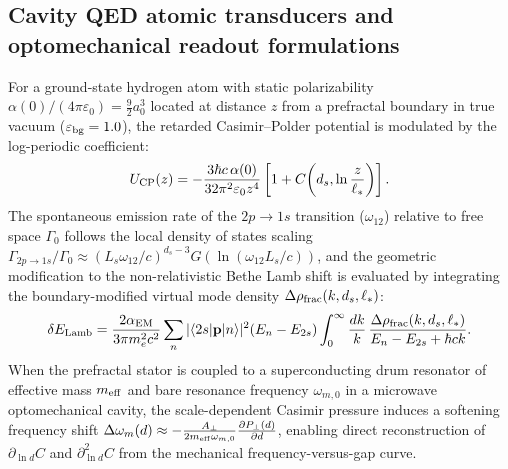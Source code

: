 \documentclass[11pt,letterpaper]{article}
\begin{document}
\subsection*{Cavity QED atomic transducers and optomechanical readout formulations}
For a ground-state hydrogen atom with static polarizability $\alpha(0)/(4\pi\varepsilon_0) = \frac{9}{2}a_0^3$ located at distance $z$ from a prefractal boundary in true vacuum ($\varepsilon_{\rm bg}=1.0$), the retarded Casimir--Polder potential is modulated by the log-periodic coefficient:
\begin{equation}
U_{\rm CP}(z) = -\frac{3\hbar c \, \alpha(0)}{32\pi^2 \varepsilon_0 z^4} \left[ 1 + C\!\left(d_s, \ln\frac{z}{\ell_*}\right) \right].
\end{equation}
The spontaneous emission rate of the $2p \to 1s$ transition ($\omega_{12}$) relative to free space $\Gamma_0$ follows the local density of states scaling $\Gamma_{2p\to 1s}/\Gamma_0 \approx (L_s \omega_{12}/c)^{d_s - 3} G(\ln(\omega_{12}L_s/c))$, and the geometric modification to the non-relativistic Bethe Lamb shift is evaluated by integrating the boundary-modified virtual mode density $\Delta\rho_{\rm frac}(k, d_s, \ell_*)$:
\begin{equation}
\delta E_{\rm Lamb} = \frac{2\alpha_{\rm EM}}{3\pi m_e^2 c^2} \sum_n |\langle 2s | \mathbf{p} | n \rangle|^2 (E_n - E_{2s}) \int_0^\infty \frac{dk}{k} \, \frac{\Delta\rho_{\rm frac}(k, d_s, \ell_*)}{E_n - E_{2s} + \hbar c k}.
\end{equation}
When the prefractal stator is coupled to a superconducting drum resonator of effective mass $m_{\rm eff}$ and bare resonance frequency $\omega_{m,0}$ in a microwave optomechanical cavity\cite{casimir_drum2025}, the scale-dependent Casimir pressure induces a softening frequency shift $\Delta\omega_m(d) \approx -\frac{A_\perp}{2 m_{\rm eff} \omega_{m,0}} \frac{\partial P_\perp(d)}{\partial d}$, enabling direct reconstruction of $\partial_{\ln d}C$ and $\partial_{\ln d}^2 C$ from the mechanical frequency-versus-gap curve.
\end{document}
